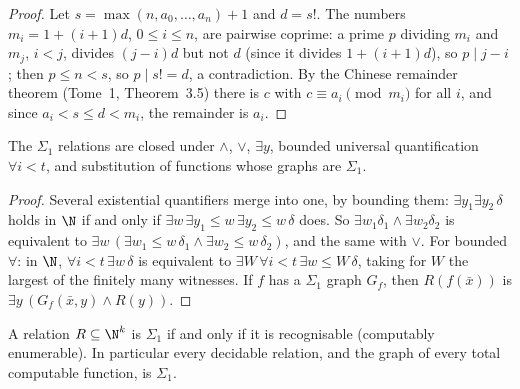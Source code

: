 \begin{proof}
Let $s=\max(n,a_0,\dots,a_n)+1$ and $d=s!$. The numbers $m_i=1+(i+1)d$, $0\le i\le n$, are pairwise coprime: a prime $p$ dividing $m_i$ and $m_j$, $i<j$, divides $(j-i)d$ but not $d$ (since it divides $1+(i+1)d$), so $p\mid j-i$; then $p\le n<s$, so $p\mid s!=d$, a contradiction. By the Chinese remainder theorem (Tome~1, Theorem~3.5) there is $c$ with $c\equiv a_i\pmod{m_i}$ for all $i$, and since $a_i<s\le d<m_i$, the remainder is $a_i$.
\end{proof}

\begin{lemma}\label{lem:sigma1closure}
The $\Sigma_1$ relations are closed under $\land$, $\lor$, $\exists y$, bounded universal quantification $\forall i<t$, and substitution of functions whose graphs are $\Sigma_1$.
\end{lemma}

\begin{proof}
Several existential quantifiers merge into one, by bounding them: $\exists y_1\exists y_2\,\delta$ holds in $\N$ if and only if $\exists w\,\exists y_1\le w\,\exists y_2\le w\,\delta$ does. So $\exists w_1\delta_1\land\exists w_2\delta_2$ is equivalent to $\exists w\,(\exists w_1\le w\,\delta_1\land\exists w_2\le w\,\delta_2)$, and the same with $\lor$. For bounded $\forall$: in $\N$, $\forall i<t\,\exists w\,\delta$ is equivalent to $\exists W\,\forall i<t\,\exists w\le W\,\delta$, taking for $W$ the largest of the finitely many witnesses. If $f$ has a $\Sigma_1$ graph $G_f$, then $R(f(\bar x))$ is $\exists y\,(G_f(\bar x,y)\land R(y))$.
\end{proof}

\begin{theorem}[Gödel, 1931]\label{thm:arithmetisation}
A relation $R\subseteq\N^k$ is $\Sigma_1$ if and only if it is recognisable (computably enumerable). In particular every decidable relation, and the graph of every total computable function, is $\Sigma_1$.
\end{theorem}

